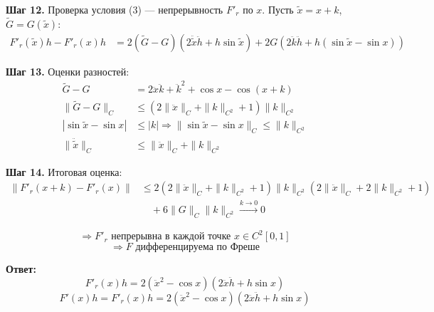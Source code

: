 \documentclass[a4paper, 12pt]{article}
\begin{document}
\textbf{Шаг 12.} Проверка условия (3) — непрерывность $F'_r$ по $x$. Пусть $\tilde{x} = x + k$, $\tilde{G} = G(\tilde{x})$:
\begin{align*}
F'_r(\tilde{x})h - F'_r(x)h &= 2(\tilde{G} - G)(2\ddot{\tilde{x}}\ddot{h} + h \sin \tilde{x}) + 2G(2\ddot{k}\ddot{h} + h(\sin \tilde{x} - \sin x))
\end{align*}

\textbf{Шаг 13.} Оценки разностей:
\begin{align*}
\tilde{G} - G &= 2\ddot{x}\ddot{k} + \ddot{k}^2 + \cos x - \cos(x + k) \\
\|\tilde{G} - G\|_C &\le (2\|\ddot{x}\|_C + \|k\|_{C^2} + 1)\|k\|_{C^2} \\
|\sin \tilde{x} - \sin x| &\le |k| \Rightarrow \|\sin \tilde{x} - \sin x\|_C \le \|k\|_{C^2} \\
\|\ddot{\tilde{x}}\|_C &\le \|\ddot{x}\|_C + \|k\|_{C^2}
\end{align*}

\textbf{Шаг 14.} Итоговая оценка:
\begin{align*}
\|F'_r(x + k) - F'_r(x)\| &\le 2(2\|\ddot{x}\|_C + \|k\|_{C^2} + 1)\|k\|_{C^2}(2\|\ddot{x}\|_C + 2\|k\|_{C^2} + 1) \\
&\quad + 6\|G\|_C \|k\|_{C^2} \xrightarrow{k \to 0} 0
\end{align*}

\[
\Rightarrow F'_r \text{ непрерывна в каждой точке } x \in C^2[0,1]
\]
\[
\Rightarrow F \text{ дифференцируема по Фреше}
\]

\textbf{Ответ:}
\[
\boxed{F'_r(x)h = 2(\ddot{x}^2 - \cos x)(2\ddot{x}\ddot{h} + h \sin x)}
\]
\[
\boxed{F'(x)h = F'_r(x)h = 2(\ddot{x}^2 - \cos x)(2\ddot{x}\ddot{h} + h \sin x)}
\]
\end{document}
